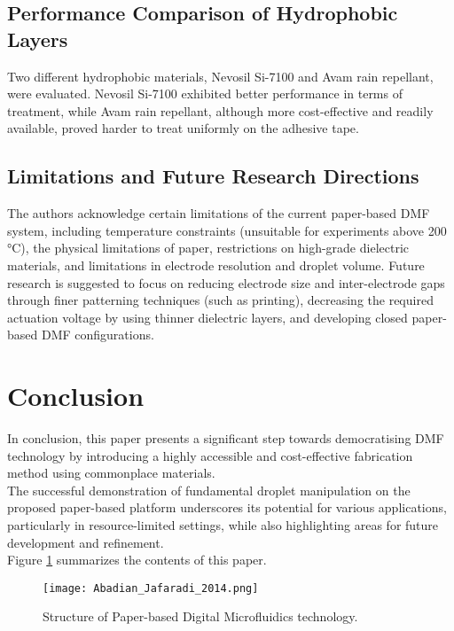 \subsection{Performance Comparison of Hydrophobic Layers} 
Two different hydrophobic materials, Nevosil Si-7100 and Avam rain repellant, were evaluated. Nevosil Si-7100 exhibited better performance in terms of treatment, while Avam rain repellant, although more cost-effective and readily available, proved harder to treat uniformly on the adhesive tape.

\subsection{Limitations and Future Research Directions} 
The authors acknowledge certain limitations of the current paper-based DMF system, including temperature constraints (unsuitable for experiments above 200 °C), the physical limitations of paper, restrictions on high-grade dielectric materials, and limitations in electrode resolution and droplet volume. Future research is suggested to focus on reducing electrode size and inter-electrode gaps through finer patterning techniques (such as printing), decreasing the required actuation voltage by using thinner dielectric layers, and developing closed paper-based DMF configurations.

\section{Conclusion}
In conclusion, this paper presents a significant step towards democratising DMF technology by introducing a highly accessible and cost-effective fabrication method using commonplace materials. \\

The successful demonstration of fundamental droplet manipulation on the proposed paper-based platform underscores its potential for various applications, particularly in resource-limited settings, while also highlighting areas for future development and refinement.\\

Figure \ref{Abadian_2014} summarizes the contents of this paper.
\begin{figure}[h!]
    \centering
    \texttt{[image: Abadian\_Jafaradi\_2014.png]}
    \caption{Structure of Paper-based Digital Microfluidics technology.}
    \label{Abadian_2014}
\end{figure}
